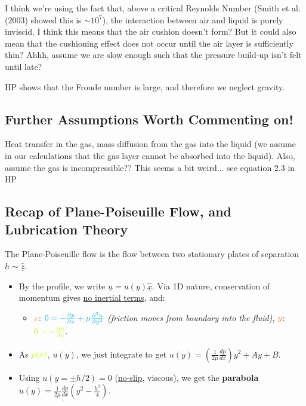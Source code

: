 \documentclass[11pt,a4paper]{article}
\begin{document}
	I think we're using the fact that, above a critical Reynolds Number (Smith et al. (2003) showed this is $\sim 10^7$), the interaction between air and liquid is purely inviscid. I think this means that the air cushion doesn't form? But it could also mean that the cushioning effect does not occur until the air layer is sufficiently thin? Ahhh, assume we are slow enough such that the pressure build-up isn't felt until late?
	
	HP shows that the Froude number is large, and therefore we neglect gravity.
	
	\subsection{Further Assumptions Worth Commenting on!}
	Heat transfer in the gas, mass diffusion from the gas into the liquid (we assume in our calculations that the gas layer cannot be absorbed into the liquid).
	Also, assume the gas is incompressible?? This seems a bit weird... see equation 2.3 in HP
	
	
	
	\subsection{Recap of Plane-Poiseuille Flow, and Lubrication Theory}
	The Plane-Poiseuille flow is the flow between two stationary plates of separation $h \sim \hat{\underline{z}}$.
	\begin{itemize}
		\item By the profile, we write $\underline{u} = u(y)\underline{\hat{x}}$. Via 1D nature, \textcolor[RGB]{255, 170, 0}{conservation of momentum} gives \underline{no inertial terms}, and:
		\begin{itemize}
			\item $\color{orange}x$: $\color{cyan}0 = -\frac{\partial p}{\partial x} + \mu \frac{\partial ^2u}{\partial y^2}$ \textit{(friction moves from boundary into the fluid)}, \quad $\color{orange}y$: $\color{lime} 0= -\frac{\partial p}{\partial y}$.
		\end{itemize}
		\item As $\color{lime}p(x)$, $u(y)$, we just \textcolor[RGB]{85, 255, 255}{integrate} to get $u(y) = \left( \frac{1}{2\mu} \frac{d p}{d x} \right) y^2 + Ay + B$.
		\item Using $u(y = \pm h/2) = 0$ (\underline{no-slip}, viscous), we get the \textbf{parabola} $\underline{u(y) = \frac{1}{2\mu} \frac{d p}{d x}\left( y^2 - \frac{h^2}{4} \right)}$.
	\end{itemize}
	
\end{document}

